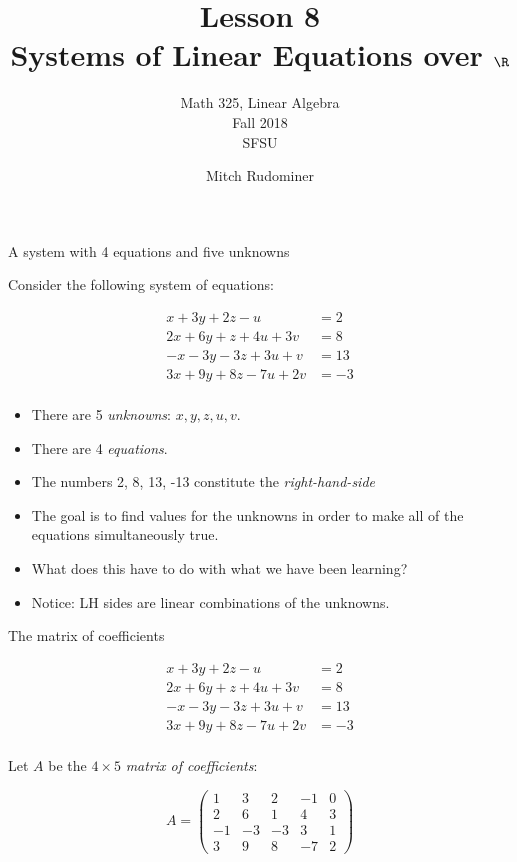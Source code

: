 \documentclass{beamer}
\title{Lesson 8 \\ Systems of Linear Equations over $\R$}
\subtitle{Math 325, Linear Algebra \\ Fall 2018 \\ SFSU}
\author{Mitch Rudominer}
\date{}
\begin{document}
\begin{frame}
  \titlepage
\end{frame}

\begin{frame}{A system with 4 equations and five unknowns}

Consider the following system of equations:

\begin{align*}
 x + 3y + 2z - u  \qquad &= 2 \\
2x + 6y + z + 4u + 3v  &= 8 \\
-x -3y  -3z + 3u + v  &= 13 \\
3x + 9y + 8z  -7u + 2v  &= -3 \\
\end{align*}

\begin{itemize}
\item There are 5 \emph{unknowns}: $x, y, z, u, v$.
\item There are 4 \emph{equations}.
\item The numbers 2, 8, 13, -13 constitute the \emph{right-hand-side}
\item The goal is to find values for the unknowns in order to make all of the
equations simultaneously true.
\item What does this have to do with what we have been learning?
\item Notice: LH sides are linear combinations of the unknowns.
\end{itemize}

\end{frame}


\begin{frame}{The matrix of coefficients}

\begin{align*}
 x + 3y + 2z - u  \qquad &= 2 \\
2x + 6y + z + 4u + 3v  &= 8 \\
-x -3y  -3z + 3u + v  &= 13 \\
3x + 9y + 8z  -7u + 2v  &= -3 \\
\end{align*}

Let $A$ be the $4 \times 5$ \emph{matrix of coefficients}:

$$
A =
\begin{pmatrix}
1 & 3 & 2 & -1 & 0 \\
2 & 6 & 1 & 4 & 3\\
-1 & -3 & -3 & 3 & 1 \\
3 & 9 & 8 & -7 & 2
\end{pmatrix}
$$

\end{frame}
\end{document}
